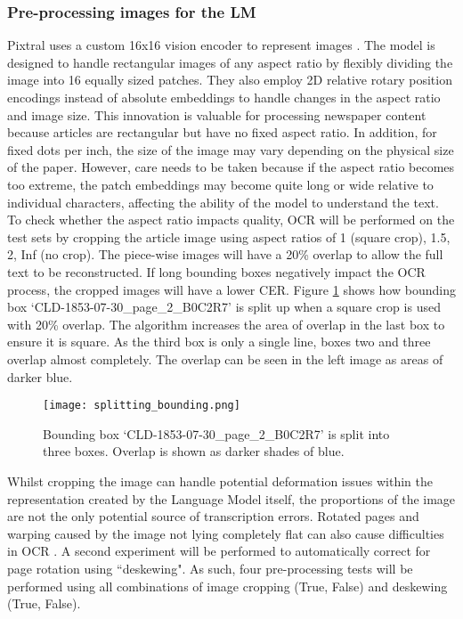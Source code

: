 \documentclass{article} %
\begin{document}
\subsubsection{Pre-processing images for the LM}

Pixtral uses a custom 16x16 vision encoder \cite{dosovitskiy_image_2021} to represent images \cite{agrawal_pixtral_2024}. The model is designed to handle rectangular images of any aspect ratio by flexibly dividing the image into 16 equally sized patches. They also employ 2D relative rotary position encodings \cite{su_roformer_2023} instead of absolute embeddings to handle changes in the aspect ratio and image size. This innovation is valuable for processing newspaper content because articles are rectangular but have no fixed aspect ratio. In addition, for fixed dots per inch, the size of the image may vary depending on the physical size of the paper. However, care needs to be taken because if the aspect ratio becomes too extreme, the patch embeddings may become quite long or wide relative to individual characters, affecting the ability of the model to understand the text. To check whether the aspect ratio impacts quality, OCR will be performed on the test sets by cropping the article image using aspect ratios of 1 (square crop), 1.5, 2, Inf (no crop). The piece-wise images will have a 20\% overlap to allow the full text to be reconstructed. If long bounding boxes negatively impact the OCR process, the cropped images will have a lower CER. Figure \ref{fig:splitting_bounding} shows how bounding box `CLD-1853-07-30\_page\_2\_B0C2R7' is split up when a square crop is used with 20\% overlap. The algorithm increases the area of overlap in the last box to ensure it is square. As the third box is only a single line, boxes two and three overlap almost completely. The overlap can be seen in the left image as areas of darker blue.

\begin{figure}
    \centering
    \texttt{[image: splitting\_bounding.png]}
    \caption{Bounding box `CLD-1853-07-30\_page\_2\_B0C2R7' is split into three boxes. Overlap is shown as darker shades of blue.}
    \label{fig:splitting_bounding}
\end{figure}

Whilst cropping the image can handle potential deformation issues within the representation created by the Language Model itself, the proportions of the image are not the only potential source of transcription errors. Rotated pages and warping caused by the image not lying completely flat can also cause difficulties in OCR \cite{girdhar_digitizing_2024, brown_document_2001}. A second experiment will be performed to automatically correct for page rotation using ``deskewing". As such, four pre-processing tests will be performed using all combinations of image cropping (True, False) and deskewing (True, False).
\end{document}
